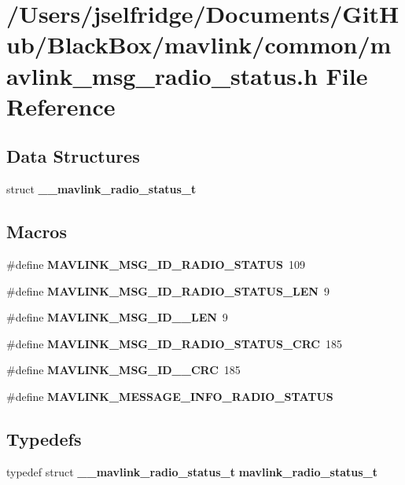 \section{/\+Users/jselfridge/\+Documents/\+Git\+Hub/\+Black\+Box/mavlink/common/mavlink\+\_\+msg\+\_\+radio\+\_\+status.h File Reference}
\label{mavlink__msg__radio__status_8h}
\subsection*{Data Structures}
\begin{DoxyCompactItemize}
\item 
struct \textbf{ \+\_\+\+\_\+mavlink\+\_\+radio\+\_\+status\+\_\+t}
\end{DoxyCompactItemize}
\subsection*{Macros}
\begin{DoxyCompactItemize}
\item 
\#define \textbf{ M\+A\+V\+L\+I\+N\+K\+\_\+\+M\+S\+G\+\_\+\+I\+D\+\_\+\+R\+A\+D\+I\+O\+\_\+\+S\+T\+A\+T\+US}~109
\item 
\#define \textbf{ M\+A\+V\+L\+I\+N\+K\+\_\+\+M\+S\+G\+\_\+\+I\+D\+\_\+\+R\+A\+D\+I\+O\+\_\+\+S\+T\+A\+T\+U\+S\+\_\+\+L\+EN}~9
\item 
\#define \textbf{ M\+A\+V\+L\+I\+N\+K\+\_\+\+M\+S\+G\+\_\+\+I\+D\+\_\+\_\+\+L\+EN}~9
\item 
\#define \textbf{ M\+A\+V\+L\+I\+N\+K\+\_\+\+M\+S\+G\+\_\+\+I\+D\+\_\+\+R\+A\+D\+I\+O\+\_\+\+S\+T\+A\+T\+U\+S\+\_\+\+C\+RC}~185
\item 
\#define \textbf{ M\+A\+V\+L\+I\+N\+K\+\_\+\+M\+S\+G\+\_\+\+I\+D\+\_\+\_\+\+C\+RC}~185
\item 
\#define \textbf{ M\+A\+V\+L\+I\+N\+K\+\_\+\+M\+E\+S\+S\+A\+G\+E\+\_\+\+I\+N\+F\+O\+\_\+\+R\+A\+D\+I\+O\+\_\+\+S\+T\+A\+T\+US}
\end{DoxyCompactItemize}
\subsection*{Typedefs}
\begin{DoxyCompactItemize}
\item 
typedef struct \textbf{ \+\_\+\+\_\+mavlink\+\_\+radio\+\_\+status\+\_\+t} \textbf{ mavlink\+\_\+radio\+\_\+status\+\_\+t}
\end{DoxyCompactItemize}


